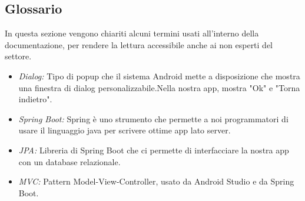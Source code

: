 \subsection{Glossario}
    \begin{flushleft}
        In questa sezione vengono chiariti alcuni termini usati all'interno della documentazione, per rendere la lettura accessibile
        anche ai non esperti del settore.
    \end{flushleft}

    \begin{itemize}
        \item \emph{Dialog:} Tipo di popup che il sistema Android mette a disposizione che mostra una finestra di dialog personalizzabile.Nella nostra app, mostra "Ok" e "Torna indietro".
        \item \emph{Spring Boot:} Spring è uno strumento che permette a noi programmatori di usare il linguaggio java per scrivere ottime app lato server.
        \item \emph{JPA:} Libreria di Spring Boot che ci permette di interfacciare la nostra app con un database relazionale.
        \item \emph{MVC:} Pattern Model-View-Controller, usato da Android Studio e da Spring Boot.
    \end{itemize}